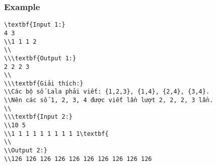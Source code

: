\subsubsection{   Example  }
\begin{verbatim}
\textbf{Input 1:}
4 3
\\1 1 1 2
\\
\\\textbf{Output 1:}
2 2 2 3 
\\
\\\textbf{Giải thích:}
\\Các bộ số Lala phải viết: {1,2,3}, {1,4}, {2,4}, {3,4}. 
\\Nên các số 1, 2, 3, 4 được viết lần lượt 2, 2, 2, 3 lần.
\\
\\\textbf{Input 2:}
\\10 5
\\1 1 1 1 1 1 1 1 1 1\textbf{
\\
\\Output 2:}
\\126 126 126 126 126 126 126 126 126 126 \end{verbatim}
